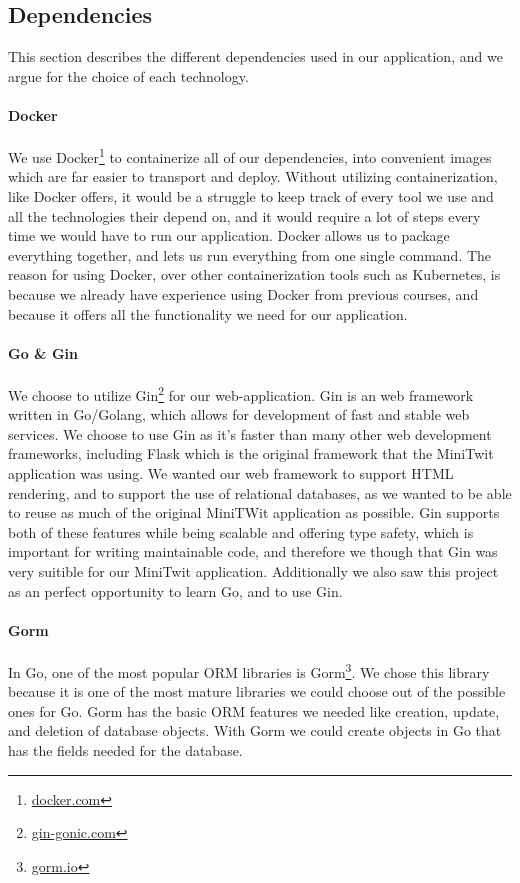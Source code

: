 \subsection{Dependencies} \label{sec:dependencies}
This section describes the different dependencies used in our application, and we argue for the choice of each technology.

\paragraph*{Docker}
We use Docker\footnote{\href{https://www.docker.com/}{docker.com}} to containerize all of our dependencies, into convenient images which are far easier to transport and deploy. Without utilizing containerization, like Docker offers, it would be a struggle to keep track of every tool we use and all the technologies their depend on, and it would require a lot of steps every time we would have to run our application. Docker allows us to package everything together, and lets us run everything from one single command. The reason for using Docker, over other containerization tools such as Kubernetes, is because we already have experience using Docker from previous courses, and because it offers all the functionality we need for our application.

\paragraph*{Go \& Gin}
We choose to utilize Gin\footnote{\href{https://gin-gonic.com/}{gin-gonic.com}} for our web-application. Gin is an web framework written in Go/Golang, which allows for development of fast and stable web services. We choose to use Gin as it's faster than many other web development frameworks, including Flask which is the original framework that the MiniTwit application was using. We wanted our web framework to support HTML rendering, and to support the use of relational databases, as we wanted to be able to reuse as much of the original MiniTWit application as possible. Gin supports both of these features while being scalable and offering type safety, which is important for writing maintainable code, and therefore we though that Gin was very suitible for our MiniTwit application. Additionally we also saw this project as an perfect opportunity to learn Go, and to use Gin.

\paragraph*{Gorm}
In Go, one of the most popular ORM libraries is Gorm\footnote{\href{https://gorm.io/}{gorm.io}}. We chose this library because it is one of the most mature libraries we could choose out of the possible ones for Go. Gorm has the basic ORM features we needed like creation, update, and deletion of database objects. With Gorm we could create objects in Go that has the fields needed for the database.

